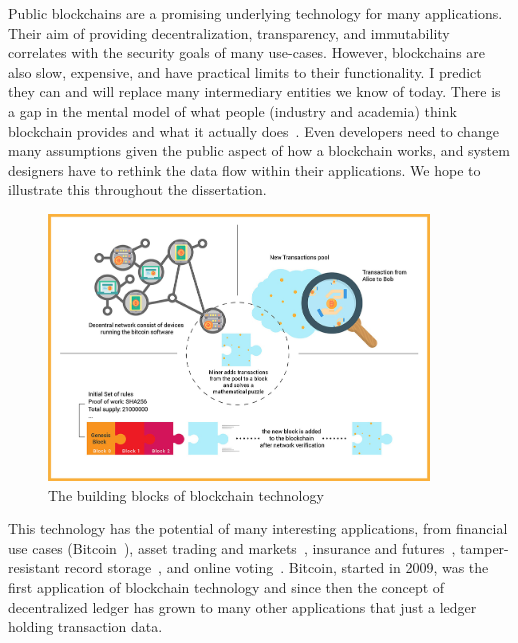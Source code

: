 Public blockchains are a promising underlying technology for many applications. Their aim of providing decentralization, transparency, and immutability correlates with the security goals of many use-cases. However, blockchains are also slow, expensive, and have practical limits to their functionality. I predict they can and will replace many intermediary entities we know of today. There is a gap in the mental model of what people (industry and academia) think blockchain provides and what it actually does~\cite{RKYCC20}. Even developers need to change many assumptions given the public aspect of how a blockchain works, and system designers have to rethink the data flow within their applications. We hope to illustrate this throughout the dissertation. 


\begin{figure}[t]
    \centering
     \includegraphics[width=0.9\textwidth]{figures/blockchain-buildingblocks.jpg}
    \caption[The Building Blocks of Blockchain Technology]{The building blocks of blockchain technology} 
\end{figure}


This technology has the potential of many interesting applications, from financial use cases (\eg Bitcoin~\cite{nakamoto2008bitcoin}), asset trading and markets~\cite{clark2014decentralizing,uniswapexplained}, insurance and futures~\cite{massacci2018futuresmex,muller2000weather}, tamper-resistant record storage~\cite{catenaEth}, and online voting~\cite{mccorry2017smart,aragonwebsite}. Bitcoin, started in 2009, was the first application of blockchain technology and since then the concept of decentralized ledger has grown to many other applications that just a ledger holding transaction data.


